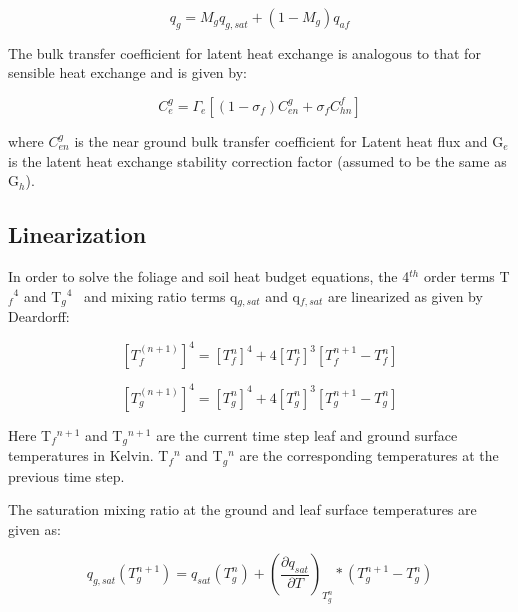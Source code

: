 \begin{equation}
{q_g} = {M_g}{q_{g,sat}} + \left( {1 - {M_g}} \right){q_{af}}
\end{equation}

The bulk transfer coefficient for latent heat exchange is analogous to that for sensible heat exchange and is given by:

\begin{equation}
C_e^g = {\Gamma_e}\left[ {\left( {1 - {\sigma_f}} \right)C_{en}^g + {\sigma_f}C_{hn}^f} \right]
\end{equation}

where \(C_{en}^g\) is the near ground bulk transfer coefficient for Latent heat flux and G\(_{e}\) is the latent heat exchange stability correction factor (assumed to be the same as G\(_{h}\)).

\subsection{Linearization}\label{linearization}

In order to solve the foliage and soil heat budget equations, the 4\(^{th}\) order terms T\(_{f}\)\(^{4}\) and T\(_{g}\)\(^{4}\) ~and mixing ratio terms q\(_{g,sat}\) and q\(_{f,sat}\) are linearized as given by Deardorff:

\begin{equation}
{\left[ {T_f^{\left( {n + 1} \right)}} \right]^4} = {\left[ {T_f^n} \right]^4} + 4{\left[ {T_f^n} \right]^3}\left[ {T_f^{n + 1} - T_f^n} \right]
\end{equation}

\begin{equation}
{\left[ {T_g^{\left( {n + 1} \right)}} \right]^4} = {\left[ {T_g^n} \right]^4} + 4{\left[ {T_g^n} \right]^3}\left[ {T_g^{n + 1} - T_g^n} \right]
\end{equation}

Here T\(_{f}\)\(^{n+1}\) and T\(_{g}\)\(^{n+1}\) are the current time step leaf and ground surface temperatures in Kelvin. T\(_{f}\)\(^{n}\) and T\(_{g}\)\(^{n}\) are the corresponding temperatures at the previous time step.

The saturation mixing ratio at the ground and leaf surface temperatures are given as:

\begin{equation}
{q_{g,sat}}\left( {T_g^{n + 1}} \right) = {q_{sat}}\left( {T_g^n} \right) + {\left( {\frac{{\partial {q_{sat}}}}{{\partial T}}} \right)_{T_g^n}} * \left( {T_g^{n + 1} - T_g^n} \right)
\end{equation}

